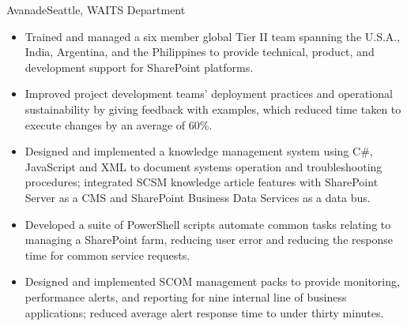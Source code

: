 \documentclass[11pt,letter,roman]{moderncv}
\begin{document}
{Avanade}{Seattle, WA}{ITS Department}{%
  \begin{itemize}
    \item Trained and managed a six member global Tier II team spanning the
      U.S.A., India, Argentina, and the Philippines to provide technical,
      product, and development support for SharePoint platforms.
    \item Improved project development teams' deployment practices and
      operational sustainability by giving feedback with examples, which
      reduced time taken to execute changes by an average of 60\%.
    \item Designed and implemented a knowledge management system using C\#,
      JavaScript and XML to document systems operation and troubleshooting
      procedures; integrated SCSM knowledge article features with SharePoint
      Server as a CMS and SharePoint Business Data Services as a data bus.
    \item Developed a suite of PowerShell scripts automate common tasks
      relating to managing a SharePoint farm, reducing user error and reducing
      the response time for common service requests.
    \item Designed and implemented SCOM management packs to provide monitoring,
      performance alerts, and reporting for nine internal line of business
      applications; reduced average alert response time to under thirty minutes.
  \end{itemize}
}
\end{document}
